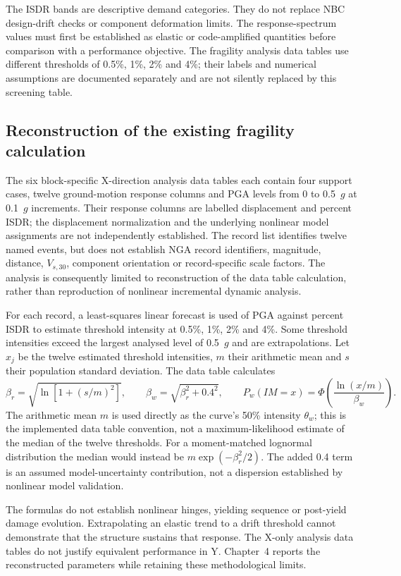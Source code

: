 The ISDR bands are descriptive demand categories. They do not replace NBC design-drift checks or component deformation limits. The response-spectrum values must first be established as elastic or code-amplified quantities before comparison with a performance objective. The fragility analysis data tables use different thresholds of 0.5\%, 1\%, 2\% and 4\%; their labels and numerical assumptions are documented separately and are not silently replaced by this screening table.

\subsection{Reconstruction of the existing fragility calculation}
The six block-specific X-direction analysis data tables each contain four support cases, twelve ground-motion response columns and PGA levels from 0 to 0.5~$g$ at 0.1~$g$ increments. Their response columns are labelled displacement and percent ISDR; the displacement normalization and the underlying nonlinear model assignments are not independently established. The record list identifies twelve named events, but does not establish NGA record identifiers, magnitude, distance, $V_{s,30}$, component orientation or record-specific scale factors. The analysis is consequently limited to reconstruction of the data table calculation, rather than reproduction of nonlinear incremental dynamic analysis.

For each record, a least-squares linear forecast is used of PGA against percent ISDR to estimate threshold intensity at 0.5\%, 1\%, 2\% and 4\%. Some threshold intensities exceed the largest analysed level of 0.5~$g$ and are extrapolations. Let $x_j$ be the twelve estimated threshold intensities, $m$ their arithmetic mean and $s$ their population standard deviation. The data table calculates
\[
\beta_r=\sqrt{\ln[1+(s/m)^2]},\qquad
\beta_w=\sqrt{\beta_r^2+0.4^2},\qquad
P_w(IM=x)=\Phi\!\left(\frac{\ln(x/m)}{\beta_w}\right).
\]
The arithmetic mean $m$ is used directly as the curve's 50\% intensity $\theta_w$; this is the implemented data table convention, not a maximum-likelihood estimate of the median of the twelve thresholds. For a moment-matched lognormal distribution the median would instead be $m\exp(-\beta_r^2/2)$. The added 0.4 term is an assumed model-uncertainty contribution, not a dispersion established by nonlinear model validation.

The formulas do not establish nonlinear hinges, yielding sequence or post-yield damage evolution. Extrapolating an elastic trend to a drift threshold cannot demonstrate that the structure sustains that response. The X-only analysis data tables do not justify equivalent performance in Y. Chapter~4 reports the reconstructed parameters while retaining these methodological limits.

